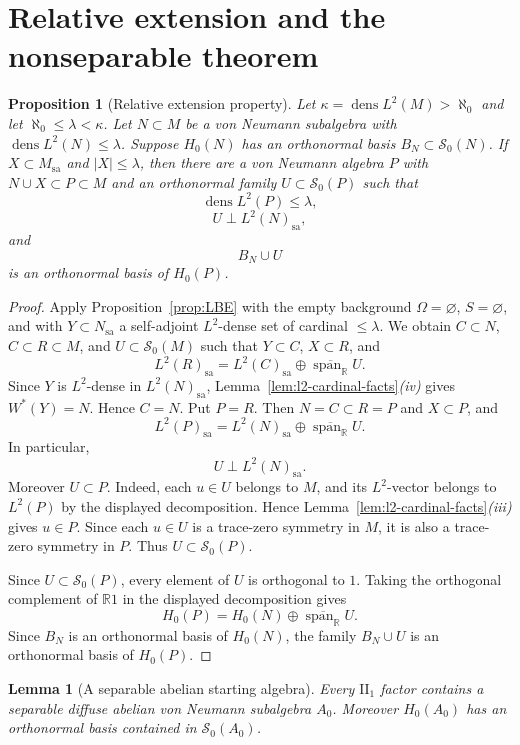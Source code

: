 \documentclass[11pt,letterpaper,reqno]{amsart}
\newtheorem{lem}[thm]{Lemma}
\newtheorem{prop}[thm]{Proposition}
\theoremstyle{definition}
\numberwithin{equation}{section}
\newcommand{\sa}{\mathrm{sa}}
\newcommand{\RR}{\mathbb R}
\newcommand{\one}{1}
\DeclareMathOperator{\spanop}{span}
\DeclareMathOperator{\dens}{dens}
\begin{document}
\section{Relative extension and the nonseparable theorem}\label{sec:nonseparable-main}

\begin{prop}[Relative extension property]\label{prop:RE}
Let $\kappa=\dens L^2(M)>\aleph_0$ and let $\aleph_0\leq\lambda<\kappa$.  Let $N\subset M$ be a von Neumann subalgebra with $\dens L^2(N)\leq\lambda$.  Suppose $H_0(N)$ has an orthonormal basis $B_N\subset\mathcal S_0(N)$.  If $X\subset M_{\sa}$ and $|X|\leq\lambda$, then there are a von Neumann algebra $P$ with $N\cup X\subset P\subset M$ and an orthonormal family \(U\subset\mathcal S_0(P)\) such that
\[
   \dens L^2(P)\leq\lambda,
\]
\[
   U\perp L^2(N)_{\sa},
\]
and
\[
   B_N\cup U
\]
is an orthonormal basis of $H_0(P)$.
\end{prop}

\begin{proof}
Apply Proposition~\ref{prop:LBE} with the empty background
$\Omega=\varnothing$, $S=\varnothing$, and with
$Y\subset N_{\sa}$ a self-adjoint $L^2$-dense set of cardinal
$\leq\lambda$.  We obtain $C\subset N$, $C\subset R\subset M$, and
$U\subset\mathcal S_0(M)$ such that $Y\subset C$, $X\subset R$, and
\[
   L^2(R)_{\sa}=L^2(C)_{\sa}\oplus\overline{\spanop_{\RR}}U.
\]
Since $Y$ is $L^2$-dense in $L^2(N)_{\sa}$,
Lemma~\ref{lem:l2-cardinal-facts}\emph{(iv)} gives $W^*(Y)=N$.
Hence $C=N$.  Put \(P=R\).  Then \(N=C\subset R=P\) and \(X\subset P\), and
\[
   L^2(P)_{\sa}=L^2(N)_{\sa}\oplus\overline{\spanop_{\RR}}U.
\]
In particular,
\[
   U\perp L^2(N)_{\sa}.
\]
Moreover \(U\subset P\).  Indeed, each \(u\in U\) belongs to \(M\), and its
\(L^2\)-vector belongs to \(L^2(P)\) by the displayed decomposition.  Hence
Lemma~\ref{lem:l2-cardinal-facts}\emph{(iii)} gives \(u\in P\).  Since each
\(u\in U\) is a trace-zero symmetry in \(M\), it is also a trace-zero symmetry
in \(P\).  Thus \(U\subset\mathcal S_0(P)\).

Since \(U\subset\mathcal S_0(P)\), every element of \(U\) is orthogonal to
\(\one\). Taking the orthogonal complement of \(\RR\one\) in the displayed
decomposition gives
\[
   H_0(P)=H_0(N)\oplus\overline{\spanop_{\RR}}U .
\]
Since \(B_N\) is an orthonormal basis of \(H_0(N)\), the family
\(B_N\cup U\) is an orthonormal basis of \(H_0(P)\).
\end{proof}

\begin{lem}[A separable abelian starting algebra]\label{lem:start}
Every $\mathrm{II}_1$ factor contains a separable diffuse abelian von Neumann subalgebra $A_0$.  Moreover $H_0(A_0)$ has an orthonormal basis contained in $\mathcal S_0(A_0)$.
\end{lem}
\end{document}

